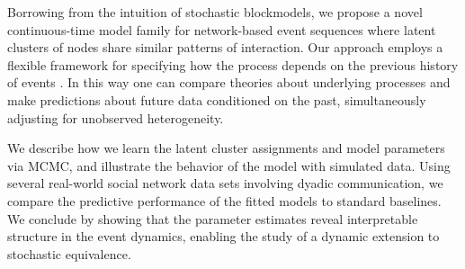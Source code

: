 %

Borrowing from the intuition of stochastic blockmodels, we propose a novel continuous-time model family for network-based event sequences where latent clusters of nodes share similar patterns of interaction.
Our approach employs a flexible framework for  specifying how the process depends on the previous history of events \cite{AalenOddO.2008, Butts2008}.
In this way one can compare theories about underlying processes and make predictions about future data conditioned on the past, simultaneously adjusting for unobserved heterogeneity.

We describe how we learn the latent cluster assignments and model parameters via MCMC, and illustrate the behavior of the model with simulated data.
Using several real-world social network data sets involving dyadic communication, we compare the predictive performance of the fitted models to standard baselines.
We conclude by showing that the parameter estimates reveal interpretable structure in the event dynamics, enabling the study of a dynamic extension to stochastic equivalence.

